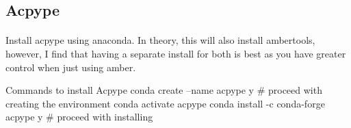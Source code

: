 \subsection{Acpype}
    \paragraph{}
    Install acpype using anaconda. In theory, this will also install ambertools, however, I find that having a separate install for both is best as you have greater control when just using amber.
    \begin{bashcmd}[label=listing:ACPYPEINST]{Commands to install Acpype}
    conda create --name acpype
        y   # proceed with creating the environment
    conda activate acpype
    conda install -c conda-forge acpype
        y   # proceed with installing
    \end{bashcmd}

